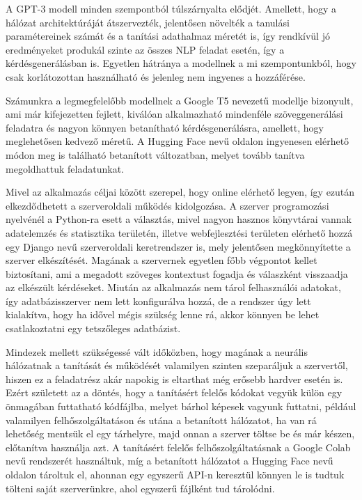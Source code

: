 A GPT-3 modell minden szempontból túlszárnyalta elődjét. Amellett, hogy a hálózat architektúráját átszervezték, jelentősen növelték a tanulási paramétereinek számát és a tanítási adathalmaz méretét is, így rendkívül jó eredményeket produkál szinte az összes NLP feladat esetén, így a kérdésgenerálásban is. Egyetlen hátránya a modellnek a mi szempontunkból, hogy csak korlátozottan használható és jelenleg nem ingyenes a hozzáférése.

Számunkra a legmegfelelőbb modellnek a Google T5 nevezetű modellje bizonyult, ami már kifejezetten fejlett, kiválóan alkalmazható mindenféle szöveggenerálási feladatra és nagyon könnyen betanítható kérdésgenerálásra, amellett, hogy meglehetősen kedvező méretű. A Hugging Face nevű oldalon ingyenesen elérhető módon meg is található betanított változatban, melyet tovább tanítva megoldhattuk feladatunkat.

Mivel az alkalmazás céljai között szerepel, hogy online elérhető legyen, így ezután elkezdődhetett a szerveroldali működés kidolgozása. A szerver programozási nyelvénél a Python-ra esett a választás, mivel nagyon hasznos könyvtárai vannak adatelemzés és statisztika területén, illetve webfejlesztési területen elérhető hozzá egy Django nevű szerveroldali keretrendszer is, mely jelentősen megkönnyítette a szerver elkészítését. Magának a szervernek egyetlen főbb végpontot kellet biztosítani, ami a megadott szöveges kontextust fogadja és válaszként visszaadja az elkészült kérdéseket. Miután az alkalmazás nem tárol felhasználói adatokat, így adatbázisszerver nem lett konfigurálva hozzá, de a rendszer úgy lett kialakítva, hogy ha idővel mégis szükség lenne rá, akkor könnyen be lehet csatlakoztatni egy tetszőleges adatbázist. 

Mindezek mellett szükségessé vált időközben, hogy magának a neurális hálózatnak a tanítását és működését valamilyen szinten szeparáljuk a szervertől, hiszen ez a feladatrész akár napokig is eltarthat még erősebb hardver esetén is. Ezért született az a döntés, hogy a tanításért felelős kódokat vegyük külön egy önmagában futtatható kódfájlba, melyet bárhol képesek vagyunk futtatni, például valamilyen felhőszolgáltatáson és utána a betanított hálózatot, ha van rá lehetőség mentsük el egy tárhelyre, majd onnan a szerver töltse be és már készen, előtanítva használja azt. A tanításért felelős felhőszolgáltatásnak a Google Colab nevű rendszerét használtuk, míg a betanított hálózatot a Hugging Face nevű oldalon tároltuk el, ahonnan egy egyszerű API-n keresztül könnyen le is tudtuk tölteni saját szerverünkre, ahol egyszerű fájlként tud tárolódni.

